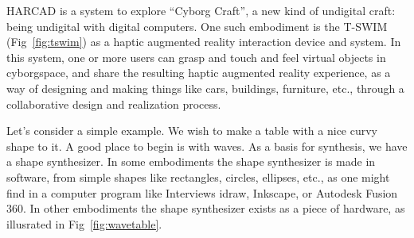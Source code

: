 HARCAD is a system to
explore ``Cyborg Craft'', a new kind of undigital craft: being undigital
with digital computers.
One such embodiment is the T-SWIM
(Fig~\ref{fig:tswim})
as a haptic augmented reality interaction device and system.
In this system, one or more users can grasp and touch and feel virtual
objects in cyborgspace, and share the resulting haptic augmented reality
experience, as a way of designing and making things like cars,
buildings, furniture, etc., through a collaborative design and
realization process.

Let's consider a simple example.  We wish to make a table with a nice
curvy shape to it.  A good place to begin is with waves.
As a basis for synthesis, we have a shape synthesizer.
In some embodiments the shape synthesizer is made in software,
from simple shapes like rectangles, circles, ellipses, etc., as one
might find in a computer program like Interviews idraw,
Inkscape, or Autodesk Fusion 360.
In other embodiments the shape synthesizer exists as a piece of hardware,
as illusrated in Fig~\ref{fig:wavetable}.
